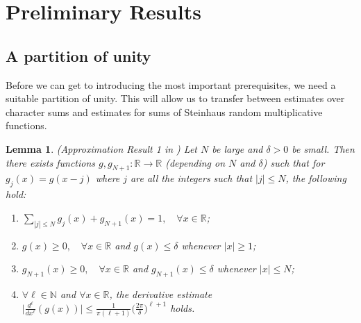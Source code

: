 \documentclass[10pt,a4paper]{amsart}
\newtheorem{lemma}{Lemma}
\numberwithin{equation}{section}
\begin{document}
\section{Preliminary Results} \label{sec2}
\subsection{A partition of unity}
Before we can get to introducing the most important prerequisites, we need a suitable partition of unity. This will allow us to transfer between estimates over character sums and estimates for sums of Steinhaus random multiplicative functions.
\begin{lemma}
    (Approximation Result 1 in \cite{harper2023typicalsizecharacterzeta}) Let $N$ be large and $\delta>0$ be small. Then there exists functions $g,g_{N+1}:\mathbb{R} \to \mathbb{R}$ (depending on $N$ and $\delta$) such that for $g_j(x) = g(x-j)$ where $j$ are all the integers such that $|j| \leq N$, the following hold:
    \begin{enumerate}
        \item $\sum_{|j| \leq N}g_j(x) + g_{N+1}(x) = 1, \quad \forall x \in \mathbb{R}$;
        \item $g(x) \geq 0, \quad \forall x \in \mathbb{R}$ and $g(x) \leq \delta$ whenever $|x| \geq 1$;
        \item $g_{N+1}(x) \geq 0, \quad \forall x \in \mathbb{R}$ and $g_{N+1}(x) \leq \delta$ whenever $|x| \leq N$;
        \item $\forall \ell \in \mathbb{N}$ and $\forall x \in \mathbb{R}$, the derivative estimate $\big|\frac{d^{\ell}}{dx^{\ell}}(g(x))\big| \leq \frac{1}{\pi(\ell+1)}\bigg(\frac{2\pi}{\delta}\bigg)^{\ell+1}$ holds.
    \end{enumerate}
    \label{partition_result}
\end{lemma}
\end{document}
